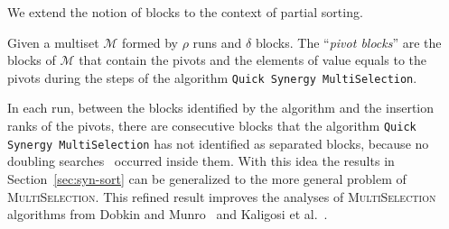 We extend the notion of blocks to the context of partial sorting.
\begin{INUTILE}
  \begin{definition}
    Given a multiset $\mathcal{M}$ formed by $\rho$ runs and $\delta$
    blocks. The ``\emph{pivot blocks}'' are the blocks of
    $\mathcal{M}$ that contain the pivots and the elements of value
    equals to the pivots during the steps of the algorithm
    \texttt{Quick Synergy MultiSelection}.
  \end{definition}
\end{INUTILE}
In each run, between the blocks identified by the algorithm and the
insertion ranks of the pivots, there are consecutive blocks that the
algorithm \texttt{Quick Synergy MultiSelection} has not identified as
separated blocks, because no doubling
searches~\cite{1976-IPL-AnAlmostOptimalAlgorithmForUnboundedSearching-BentleyYao}
occurred inside them.  With this idea the results in
Section~\ref{sec:syn-sort} can be generalized to the more general
problem of \textsc{MultiSelection}. This refined result improves the
analyses of \textsc{MultiSelection} algorithms from Dobkin and
Munro~\cite{1981-JACM-OptimalTimeMinimalSpaceSelectionAlgorithms-DobkinMunro}
and Kaligosi et
al.~\cite{2005-ICALP-TowardsOptimalMultopleSelection-KaligosiMehlhornMunroSanders}.
 
